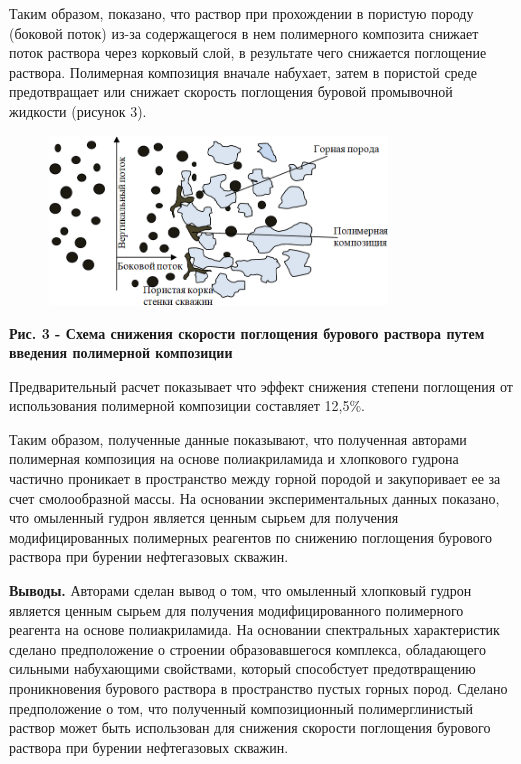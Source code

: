 Таким образом, показано, что раствор при прохождении в пористую породу
(боковой поток) из-за содержащегося в нем полимерного композита снижает
поток раствора через корковый слой, в результате чего снижается
поглощение раствора. Полимерная композиция вначале набухает, затем в
пористой среде предотвращает или снижает скорость поглощения буровой
промывочной жидкости (рисунок 3).

\begin{figure}[H]
	\centering
	\includegraphics[width=0.8\textwidth]{assets/1263}
	\caption*{}
\end{figure}

{\bfseries Рис. 3 - Схема снижения скорости поглощения бурового раствора
путем введения полимерной композиции}

Предварительный расчет показывает что эффект снижения степени поглощения
от использования полимерной композиции составляет 12,5\%.

Таким образом, полученные данные показывают, что полученная авторами
полимерная композиция на основе полиакриламида и хлопкового гудрона
частично проникает в пространство между горной породой и закупоривает ее
за счет смолообразной массы. На основании экспериментальных данных
показано, что омыленный гудрон является ценным сырьем для получения
модифицированных полимерных реагентов по снижению поглощения бурового
раствора при бурении нефтегазовых скважин.

{\bfseries Выводы.} Авторами сделан вывод о том, что омыленный хлопковый
гудрон является ценным сырьем для получения модифицированного
полимерного реагента на основе полиакриламида. На основании спектральных
характеристик сделано предположение о строении образовавшегося
комплекса, обладающего сильными набухающими свойствами, который
способстует предотвращению проникновения бурового раствора в
пространство пустых горных пород. Сделано предположение о том, что
полученный композиционный полимерглинистый раствор может быть
использован для снижения скорости поглощения бурового раствора при
бурении нефтегазовых скважин.

